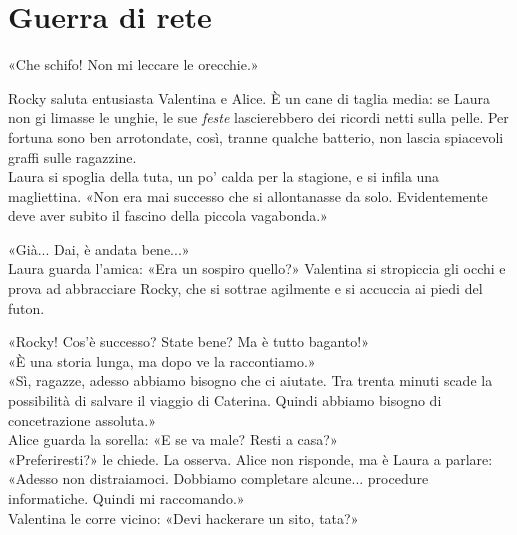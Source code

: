 \chapter{Guerra di rete}

«Che schifo! Non mi leccare le orecchie.»

Rocky saluta entusiasta Valentina e Alice. \`E un cane di taglia media: se Laura non gi  limasse le unghie, le sue \textit{feste} lascierebbero dei ricordi netti sulla pelle. Per fortuna sono ben arrotondate, cos\`i, tranne qualche batterio, non lascia spiacevoli graffi sulle ragazzine.\\
Laura si spoglia della tuta, un po' calda per la stagione, e si infila una magliettina.
«Non era mai successo che si allontanasse da solo. Evidentemente deve aver subito il fascino della piccola vagabonda.»

«Già... Dai, \`e andata bene...»\\

Laura guarda l’amica: «Era un sospiro quello?»
Valentina si stropiccia gli occhi e prova ad abbracciare Rocky, che si sottrae agilmente e si accuccia ai piedi del futon.

\par\medskip
«Rocky! Cos'\`e successo? State bene? Ma \`e tutto baganto!»\\
«\`E una storia lunga, ma dopo ve la raccontiamo.»\\
«Sì, ragazze, adesso abbiamo bisogno che ci aiutate. Tra trenta minuti scade la possibilità di salvare il viaggio di Caterina. Quindi abbiamo bisogno di concetrazione assoluta.»\\

Alice guarda la sorella: «E se va male? Resti a casa?»\\
«Preferiresti?» le chiede. La osserva. Alice non risponde, ma \`e Laura a parlare: «Adesso non distraiamoci. Dobbiamo completare alcune... procedure informatiche. Quindi mi raccomando.»\\
Valentina le corre vicino: «Devi hackerare un sito, tata?»

